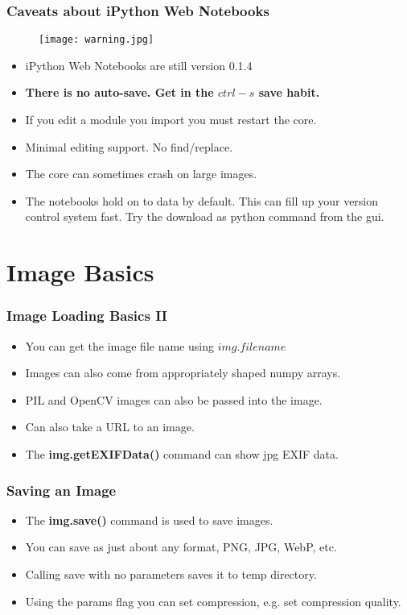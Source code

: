 \documentclass[compress]{beamer}
\begin{document}
\begin{frame}
\frametitle{Caveats about  iPython Web Notebooks}
\begin{figure}
  \texttt{[image: warning.jpg]}
\end{figure}
\begin{itemize}
\item iPython Web Notebooks are still version 0.1.4 
\item \textbf{There is no auto-save. Get in the $ctrl-s$ save habit.}
\item If you edit a module you import you must restart the core. 
\item Minimal editing support. No find/replace.
\item The core can sometimes crash on large images.
\item The notebooks hold on to data by default. This can fill up your
  version control system fast. Try the download as python command from
  the gui. 
\end{itemize}
\end{frame}
 \section{Image Basics}
\begin{frame}
\frametitle{Image Loading Basics II}
\begin{itemize}
\item You can get the image file name using $img.filename$
\item Images can also come from appropriately shaped numpy arrays.
\item PIL and OpenCV images can also be passed into the image.
\item Can also take a URL to an image. 
\item The \textbf{img.getEXIFData()} command can show jpg EXIF data.
\end{itemize}
\end{frame}

\begin{frame}
\frametitle{Saving an Image}
\begin{itemize}
\item The \textbf{img.save()} command is used to save images.
\item You can save as just about any format, PNG, JPG, WebP, etc.
\item Calling save with no parameters saves it to temp directory.
\item Using the params flag you can set compression, e.g. set
  compression quality. 
\end{itemize}
\end{frame}
\end{document}
